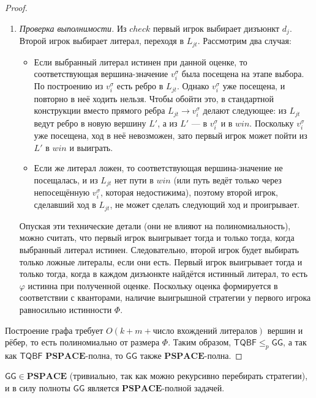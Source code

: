 \begin{proof}
\begin{enumerate}
        \item \textit{Проверка выполнимости.} Из \(\mathit{check}\) первый игрок выбирает дизъюнкт \(d_j\). Второй игрок выбирает литерал, переходя в \(L_{jt}\). Рассмотрим два случая:
        \begin{itemize}
            \item Если выбранный литерал истинен при данной оценке, то соответствующая вершина-значение \(v_i^\sigma\) была посещена на этапе выбора. По построению из \(v_i^\sigma\) есть ребро в \(L_{jt}\). Однако \(v_i^\sigma\) уже посещена, и повторно в неё ходить нельзя. Чтобы обойти это, в стандартной конструкции вместо прямого ребра \(L_{jt} \to v_i^\sigma\) делают следующее: из \(L_{jt}\) ведут ребро в новую вершину \(L'\), а из \(L'\) — в \(v_i^\sigma\) и в \(\mathit{win}\). Поскольку \(v_i^\sigma\) уже посещена, ход в неё невозможен, зато первый игрок может пойти из \(L'\) в \(\mathit{win}\) и выиграть.
            
            \item Если же литерал ложен, то соответствующая вершина-значение не посещалась, и из \(L_{jt}\) нет пути в \(\mathit{win}\) (или путь ведёт только через непосещённую \(v_i^\sigma\), которая недостижима), поэтому второй игрок, сделавший ход в \(L_{jt}\), не может сделать следующий ход и проигрывает.
        \end{itemize}
        Опуская эти технические детали (они не влияют на полиномиальность), можно считать, что первый игрок выигрывает тогда и только тогда, когда выбранный литерал истинен. Следовательно, второй игрок будет выбирать только ложные литералы, если они есть. Первый игрок выигрывает тогда и только тогда, когда в каждом дизъюнкте найдётся истинный литерал, то есть \(\varphi\) истинна при полученной оценке. Поскольку оценка формируется в соответствии с кванторами, наличие выигрышной стратегии у первого игрока равносильно истинности \(\Phi\).
    \end{enumerate}

    Построение графа требует \(O(k + m + \text{число вхождений литералов})\) вершин и рёбер, то есть полиномиально от размера \(\Phi\). Таким образом, \(\mathsf{TQBF} \le_p \mathsf{GG}\), а так как \(\mathsf{TQBF}\) \(\mathbf{PSPACE}\)-полна, то \(\mathsf{GG}\) также \(\mathbf{PSPACE}\)-полна.
\end{proof}

\begin{corollary}
    \(\mathsf{GG} \in \mathbf{PSPACE}\) (тривиально, так как можно рекурсивно перебирать стратегии), и в силу полноты \(\mathsf{GG}\) является \(\mathbf{PSPACE}\)-полной задачей.
\end{corollary}

